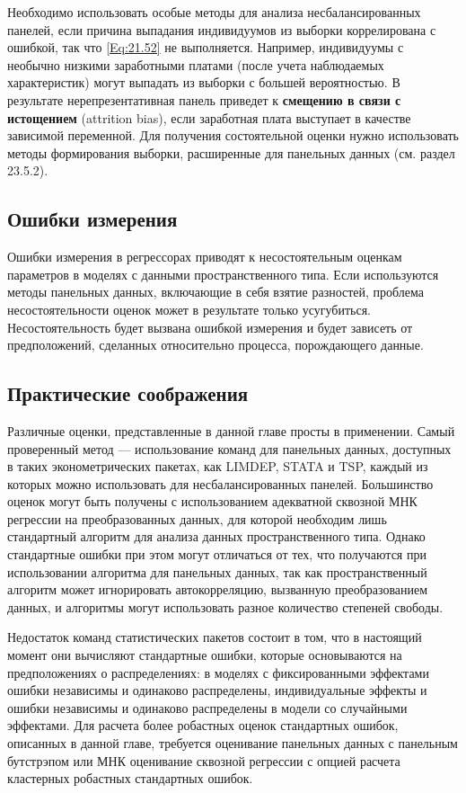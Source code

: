 Необходимо использовать особые методы для анализа несбалансированных панелей, если причина выпадания индивидуумов из выборки коррелирована с ошибкой, так что \ref{Eq:21.52} не выполняется. Например, индивидуумы с необычно низкими заработными платами (после учета наблюдаемых характеристик) могут выпадать из выборки с большей вероятностью. В результате нерепрезентативная панель приведет к \textbf{смещению в связи с истощением} (attrition bias), если заработная плата выступает в качестве зависимой переменной. Для получения состоятельной оценки нужно использовать методы формирования выборки, расширенные для панельных данных (см. раздел 23.5.2).

\subsection{Ошибки измерения}

Ошибки измерения в регрессорах приводят к несостоятельным оценкам параметров в моделях с данными пространственного типа. Если используются методы панельных данных, включающие в себя взятие разностей, проблема несостоятельности оценок может в результате только усугубиться.  Несостоятельность будет  вызвана ошибкой измерения и будет зависеть от предположений, сделанных относительно процесса, порождающего данные.

\subsection{Практические соображения}

Различные оценки, представленные в данной главе просты в применении. Самый проверенный метод --- использование команд для панельных данных, доступных в таких эконометрических пакетах, как LIMDEP, STATA и TSP, каждый из которых можно использовать для  несбалансированных панелей. Большинство оценок могут быть получены с использованием адекватной сквозной МНК регрессии на преобразованных данных, для которой необходим лишь стандартный алгоритм для анализа данных пространственного типа. Однако стандартные ошибки при этом могут отличаться от тех, что получаются при использовании алгоритма для панельных данных, так как пространственный алгоритм может игнорировать автокорреляцию, вызванную преобразованием данных, и алгоритмы могут использовать разное количество степеней свободы.

Недостаток команд статистических пакетов состоит в том, что в настоящий момент они вычисляют стандартные ошибки, которые основываются на  предположениях о распределениях: в моделях с фиксированными эффектами ошибки независимы и одинаково распределены,  индивидуальные эффекты и ошибки независимы и одинаково распределены в модели со случайными эффектами. Для расчета более робастных оценок стандартных ошибок, описанных в данной главе, требуется оценивание панельных данных с панельным бутстрэпом или МНК оценивание сквозной регрессии с опцией расчета кластерных робастных стандартных ошибок.

